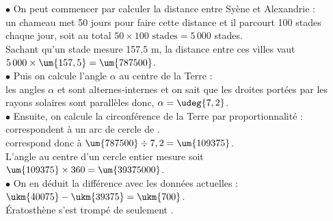 \begin{colonne*exercice}
\begin{corrige}
$\bullet$ On peut commencer par calculer la distance entre Syène et Alexandrie : \\
un chameau met 50 jours pour faire cette distance et il parcourt 100 stades chaque jour, soit au total $50\times100 \text{ stades} =5\,000$ stades. \\
Sachant qu'un stade mesure 157,5 m, la distance entre ces villes vaut $5\,000\times\um{157,5} =\um{787500}$. \\ \smallskip
$\bullet$ Puis on calcule l'angle $\alpha$ au centre de la Terre : \\
les angles $\alpha$ et  sont alternes-internes et on sait que les droites portées par les rayons solaires sont parallèles donc, $\alpha =\udeg{7,2}$. \\ \smallskip
$\bullet$ Ensuite, on calcule la circonférence de la Terre par proportionnalité : \\
 correspondent à un arc de cercle de . \\
 correspond donc à $\um{787500}\div7,2 =\um{109375}$. \\
L'angle au centre d'un cercle entier mesure  soit $\um{109375}\times360 =\um{39375000}$. \\ \smallskip
$\bullet$ On en déduit la différence avec les données actuelles : $\ukm{40075}-\ukm{39375} =\ukm{700}$. \\
{\blue Ératosthène s'est trompé de  \og seulement \fg.}

\end{corrige}

\end{colonne*exercice}


\Recreation

